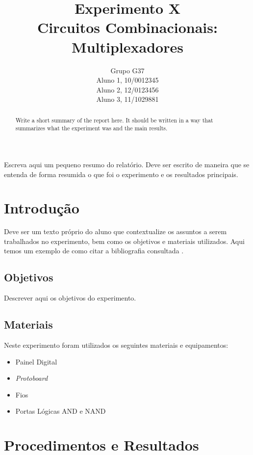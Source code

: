 \documentclass[12pt]{article}
\title{Experimento X\\ 
Circuitos Combinacionais: Multiplexadores}
\author{Grupo G37\\    %
        Aluno 1, 10/0012345\\
        Aluno 2,  12/0123456\\
        Aluno 3, 11/1029881\\
}
\begin{document}
 
\maketitle

 \begin{abstract}
Write a short summary of the report here. It should be written in a way that summarizes what the experiment was and the main results.
 \end{abstract}
    
 \begin{resumo} 
  Escreva aqui um pequeno resumo do relatório. Deve ser escrito de maneira que se entenda de forma resumida o que foi o experimento e os resultados principais.
 \end{resumo}


\section{Introdução}
\label{sec:Introducao}

Deve ser um texto próprio do aluno que contextualize os assuntos a serem trabalhados no experimento, bem como os objetivos e materiais utilizados. Aqui temos um exemplo de como citar a bibliografia consultada \cite{boulic:91} \cite{smith:99}.

\subsection{Objetivos}
\label{sec:Objetivos}

Descrever aqui os objetivos do experimento.

\subsection{Materiais} 
\label{sec:Materiais}
Neste experimento foram utilizados os seguintes materiais e equipamentos:
\begin{itemize}
    \item Painel Digital

    \item \textit{Protoboard}
    
    \item Fios
    
    \item Portas Lógicas AND e NAND
\end{itemize}

\section{Procedimentos e Resultados}
\label{sec:Procedimentos}
\end{document}

